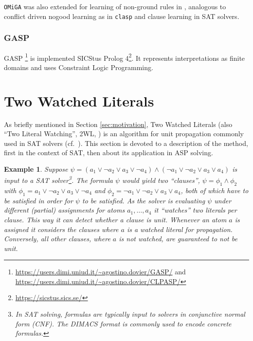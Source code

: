\documentclass{vutinfth} %
\newtheorem{example}{Example}[section]
\newcommand{\clasp}{\texttt{clasp}\xspace}
\newcommand{\omiga}{\texttt{OMiGA}\xspace}
\begin{document}
\omiga was also extended for learning of non-ground rules in \cite{nglearn}, analogous to conflict driven nogood learning as in \clasp and clause learning in SAT solvers.

\subsubsection{GASP}

GASP \cite{gasp,gasp2}\footnote{\url{https://users.dimi.uniud.it/~agostino.dovier/GASP/} and \url{https://users.dimi.uniud.it/~agostino.dovier/CLPASP/}} is implemented SICStus Prolog 4\footnote{\url{https://sicstus.sics.se/}}. It represents interpretations as finite domains and uses Constraint Logic Programming.



\section{Two Watched Literals}

As briefly mentioned in Section \ref{sec:motivation}, Two Watched Literals (also \enquote{Two Literal Watching}, 2WL, \cite{effsat,questsat}) is an algorithm for unit propagation commonly used in SAT solvers (cf.~\cite[Section 2.2.2, p.~94]{handbook-sat}). This section is devoted to a description of the method, first in the context of SAT, then about its application in ASP solving.

\begin{example}
\label{ex:clause-prop}
Suppose $\psi = (a_1 \vee \neg a_2 \vee a_3 \vee \neg a_4) \wedge (\neg a_1 \vee \neg a_2 \vee a_3 \vee a_4)$ is input to a SAT solver\footnote{In SAT solving, formulas are typically input to solvers in conjunctive normal form (CNF). The DIMACS format is commonly used to encode concrete formulas.}. The formula $\psi$ would yield two \enquote{clauses}, $\psi = \phi_1 \wedge \phi_2$ with $\phi_1 = a_1 \vee \neg a_2 \vee a_3 \vee \neg a_4$ and $\phi_2 = \neg a_1 \vee \neg a_2 \vee a_3 \vee a_4$, both of which have to be satisfied in order for $\psi$ to be satisfied. As the solver is evaluating $\psi$ under different (partial) assignments for atoms $a_1, \ldots, a_4$ it \enquote{watches} two literals per clause. This way it can detect whether a clause is unit. Whenever an atom $a$ is assigned it considers the clauses where $a$ is a watched literal for propagation. Conversely, all other clauses, where $a$ is not watched, are guaranteed to not be unit.
\end{example}
\end{document}
